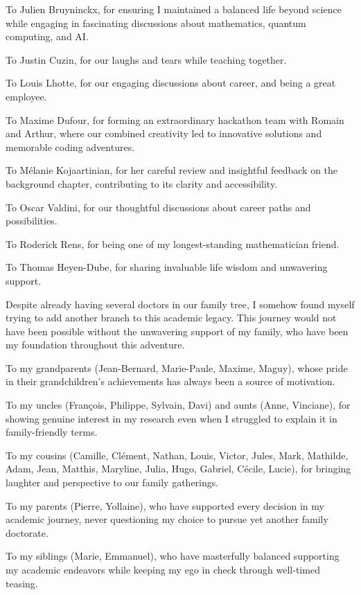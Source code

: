 To Julien Bruyninckx, for ensuring I maintained a balanced life beyond science while engaging in fascinating discussions about mathematics, quantum computing, and AI.

To Justin Cuzin, for our laughs and tears while teaching together.

To Louis Lhotte, for our engaging discussions about career, and being a great employee.

To Maxime Dufour, for forming an extraordinary hackathon team with Romain and Arthur, where our combined creativity led to innovative solutions and memorable coding adventures.

To Mélanie Kojaartinian, for her careful review and insightful feedback on the background chapter, contributing to its clarity and accessibility.

To Oscar Valdini, for our thoughtful discussions about career paths and possibilities.

To Roderick Rens, for being one of my longest-standing mathematician friend.

To Thomas Heyen-Dube, for sharing invaluable life wisdom and unwavering support.



Despite already having several doctors in our family tree, I somehow found myself trying to add another branch to this academic legacy.
This journey would not have been possible without the unwavering support of my family, who have been my foundation throughout this adventure.

To my grandparents (Jean-Bernard, Marie-Paule, Maxime, Maguy), whose pride in their grandchildren's achievements has always been a source of motivation.

To my uncles (François, Philippe, Sylvain, Davi) and aunts (Anne, Vinciane), for showing genuine interest in my research even when I struggled to explain it in family-friendly terms.

To my cousins (Camille, Clément, Nathan, Louis, Victor, Jules, Mark, Mathilde, Adam, Jean, Matthis, Maryline, Julia, Hugo, Gabriel, Cécile, Lucie), for bringing laughter and perspective to our family gatherings.

To my parents (Pierre, Yollaine), who have supported every decision in my academic journey, never questioning my choice to pursue yet another family doctorate.

To my siblings (Marie, Emmanuel), who have masterfully balanced supporting my academic endeavors while keeping my ego in check through well-timed teasing.



